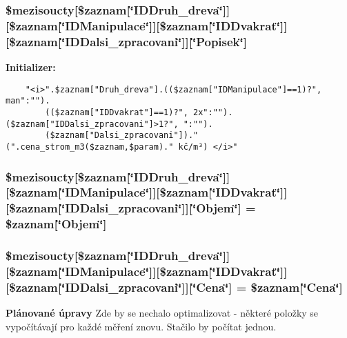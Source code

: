 \subsubsection{\setlength{\rightskip}{0pt plus 5cm}\$mezisoucty[\$zaznam[\char`\"{}IDDruh\_\-dreva\char`\"{}]][\$zaznam[\char`\"{}IDManipulace\char`\"{}]][\$zaznam[\char`\"{}IDDvakrat\char`\"{}]][\$zaznam[\char`\"{}IDDalsi\_\-zpracovani\char`\"{}]][\char`\"{}Popisek\char`\"{}]}\label{seznam_8php_40ed9d3c9da4f8c520f90fc8a4926d1e}


\textbf{Initializer:}

\begin{Code}\begin{verbatim}
    "<i>".$zaznam["Druh_dreva"].(($zaznam["IDManipulace"]==1)?", man":"").
        (($zaznam["IDDvakrat"]==1)?", 2x":"").($zaznam["IDDalsi_zpracovani"]>1?", ":"").
        ($zaznam["Dalsi_zpracovani"])." (".cena_strom_m3($zaznam,$param)." kč/m³) </i>"
\end{verbatim}
\end{Code}
\subsubsection{\setlength{\rightskip}{0pt plus 5cm}\$mezisoucty[\$zaznam[\char`\"{}IDDruh\_\-dreva\char`\"{}]][\$zaznam[\char`\"{}IDManipulace\char`\"{}]][\$zaznam[\char`\"{}IDDvakrat\char`\"{}]][\$zaznam[\char`\"{}IDDalsi\_\-zpracovani\char`\"{}]][\char`\"{}Objem\char`\"{}] = \$zaznam[\char`\"{}Objem\char`\"{}]}\label{seznam_8php_1c94fbeb3e8e94659fca2f0e763cb2e2}


\subsubsection{\setlength{\rightskip}{0pt plus 5cm}\$mezisoucty[\$zaznam[\char`\"{}IDDruh\_\-dreva\char`\"{}]][\$zaznam[\char`\"{}IDManipulace\char`\"{}]][\$zaznam[\char`\"{}IDDvakrat\char`\"{}]][\$zaznam[\char`\"{}IDDalsi\_\-zpracovani\char`\"{}]][\char`\"{}Cena\char`\"{}] = \$zaznam[\char`\"{}Cena\char`\"{}]}\label{seznam_8php_99590f361e9ab2fd6cb6d2e74d739741}


\begin{Desc}
\item[{\bf Plánované úpravy}]Zde by se nechalo optimalizovat - některé položky se vypočítávají pro každé měření znovu. Stačilo by počítat jednou. \end{Desc}
